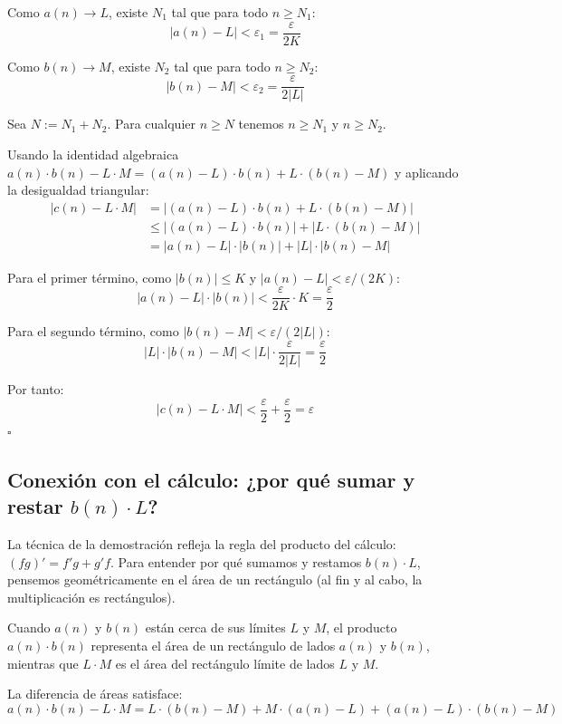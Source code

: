   Como $a(n) \to L$, existe $N_1$ tal que para todo $n \geq N_1$:
  \[
    |a(n) - L| < \varepsilon_1 = \frac{\varepsilon}{2K}
  \]

  Como $b(n) \to M$, existe $N_2$ tal que para todo $n \geq N_2$:
  \[
    |b(n) - M| < \varepsilon_2 = \frac{\varepsilon}{2|L|}
  \]

  Sea $N := N_1 + N_2$. Para cualquier $n \geq N$ tenemos $n \geq N_1$ y
  $n \geq N_2$.

  Usando la identidad algebraica
  $a(n)\cdot b(n) - L\cdot M = (a(n)-L)\cdot b(n) + L\cdot(b(n)-M)$
  y aplicando la desigualdad triangular:
  \begin{align*}
    |c(n) - L\cdot M|
    &= |(a(n)-L)\cdot b(n) + L\cdot(b(n)-M)| \\
    &\leq |(a(n)-L)\cdot b(n)| + |L\cdot(b(n)-M)| \\
    &= |a(n)-L|\cdot|b(n)| + |L|\cdot|b(n)-M|
  \end{align*}

  Para el primer término, como $|b(n)| \leq K$ y $|a(n)-L| < \varepsilon/(2K)$:
  \[
    |a(n)-L|\cdot|b(n)| < \frac{\varepsilon}{2K}\cdot K = \frac{\varepsilon}{2}
  \]

  Para el segundo término, como $|b(n)-M| < \varepsilon/(2|L|)$:
  \[
    |L|\cdot|b(n)-M| < |L|\cdot\frac{\varepsilon}{2|L|} = \frac{\varepsilon}{2}
  \]

  Por tanto:
  \[
    |c(n) - L\cdot M| < \frac{\varepsilon}{2} + \frac{\varepsilon}{2} = \varepsilon
  \]
  \hfill$\square$

\subsection{Conexión con el cálculo: ¿por qué sumar y restar \texorpdfstring{$b(n)\cdot L$}{b(n)·L}?}

La técnica de la demostración refleja la regla del producto del cálculo:
$(fg)' = f'g + g'f$. Para entender por qué sumamos y restamos $b(n)\cdot L$,
pensemos geométricamente en el área de un rectángulo (al fin y al cabo, la
multiplicación es rectángulos).

Cuando $a(n)$ y $b(n)$ están cerca de sus límites $L$ y $M$, el producto
$a(n)\cdot b(n)$ representa el área de un rectángulo de lados $a(n)$ y $b(n)$,
mientras que $L\cdot M$ es el área del rectángulo límite de lados $L$ y $M$.

La diferencia de áreas satisface:
\[
  a(n)\cdot b(n) - L\cdot M
  = L\cdot(b(n)-M) + M\cdot(a(n)-L) + (a(n)-L)\cdot(b(n)-M)
\]

